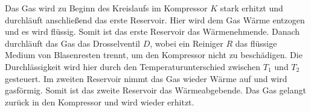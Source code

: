     Das Gas wird zu Beginn des Kreislaufs im Kompressor $K$ stark erhitzt und durchläuft anschließend das erste Reservoir.
    Hier wird dem Gas Wärme entzogen und es wird flüssig.
    Somit ist das erste Reservoir das Wärmenehmende.
    Danach durchläuft das Gas das Drosselventil $D$,
    wobei ein Reiniger $R$ das flüssige Medium von Blasenresten trennt,
    um den Kompressor nicht zu beschädigen.
    Die Durchlässigkeit wird hier durch den Temperaturunterschied zwischen $T_1$ und $T_2$ gesteuert.
    Im zweiten Reservoir nimmt das Gas wieder Wärme auf und wird gasförmig.
    Somit ist das zweite Reservoir das Wärmeabgebende.
    Das Gas gelangt zurück in den Kompressor und wird wieder erhitzt.
